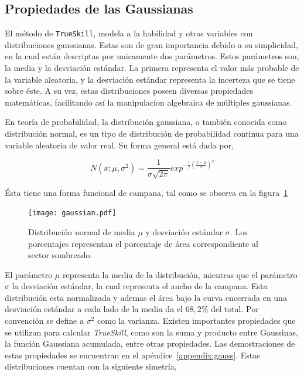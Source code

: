 \documentclass[11pt,twoside, spanish]{report} %
\begin{document}

\subsection{Propiedades de las Gaussianas}

El m\'etodo de \texttt{TrueSkill},  modela a la habilidad y otras variables con distribuciones gaussianas.
Estas son de gran importancia debido a su simplicidad, en la cual est\'an descriptas por unicamente dos  par\'ametros.
Estos par\'ametros son, la media y la desviaci\'on est\'andar.
La primera representa el valor m\'as probable de la variable aleatoria, y la desviaci\'on est\'andar representa la incerteza que se tiene sobre \'este.
A su vez, estas distribuciones poseen diversas propiedades matem\'aticas, facilitando as\'i la manipulac\'ion algebraica de m\'ultiples gaussianas.


En teor\'ia de probabilidad, la distribuci\'on gaussiana, o tambi\'en conocida como distribuci\'on normal, es un tipo de distribuci\'on de probabilidad continua para una variable aleatoria de valor real.
Su forma general est\'a dada por,

\begin{equation}
N(x;\mu, \sigma^2)=\frac{1}{\sigma\sqrt{2\pi}}exp^{-\frac{1}{2}\left(\frac{x-\mu}{\sigma}\right)^2}
\end{equation}

\'Esta tiene una forma funcional de campana, tal como se observa en la figura~\ref{fig:gaus}



\begin{figure}[H]
	\centering
	\texttt{[image: gaussian.pdf]}
	\caption{Distribuci\'on normal de media $\mu$ y desviaci\'on est\'andar $\sigma$. Los porcentajes representan el porcentaje de \'area correspondiente al sector sombreado.}
	\label{fig:gaus}
\end{figure}

El par\'ametro $\mu$ representa la media de la distribuci\'on, mientras que el par\'ametro $\sigma$ la desviaci\'on est\'andar, la cual representa el ancho de la campana.
Esta distribuci\'on esta normalizada y ademas el \'area bajo la curva encerrada en una desviaci\'on est\'andar a cada lado de la media da el $68,2\%$ del total.
Por convenci\'on se define a $\sigma^2$ como la varianza.
Existen importantes propiedades que se utilizan para calcular \textit{TrueSkill}, como son la suma y producto entre Gaussinas, la funci\'on Gaussiana acumulada, entre otras propiedades.
Las demostraciones de estas propiedades se encuentran en el ap\'endice~\ref{appendix:gauss}.
Estas distribuciones cuentan con la siguiente simetr\'ia,
\end{document}
